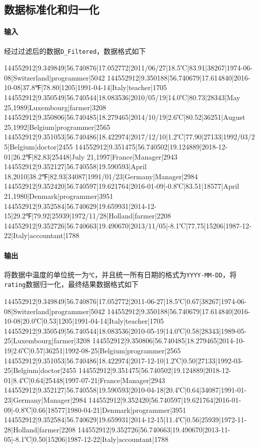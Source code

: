 \documentclass{ML}
\begin{document}
\subsection{数据标准化和归一化}
\paragraph{输入} 经过过滤后的数据\texttt{D\_Filtered}，数据格式如下
\begin{textcode}
144552912|9.349849|56.740876|17.052772|2011/06/27|18.5℃|83.91|38267|1974-06-08|Switzerland|programmer|5042
144552912|9.350188|56.740679|17.614840|2016-10-08|37.8℉|78.80|1205|1991-04-14|Italy|teacher|1705
144552912|9.350549|56.740544|18.083536|2010/05/19|14.0℃|80.73|28343|May 25,1989|Luxembourg|farmer|3208
144552912|9.350806|56.740485|18.279465|2014/10/19|2.6℃|80.52|36251|August 25,1992|Belgium|programmer|2565
144552912|9.351053|56.740486|18.422974|2017/12/10|1.2℃|77.90|27133|1992/03/25|Belgium|doctor|2455
144552912|9.351475|56.740502|19.124889|2018-12-01|26.2℉|82.83|25448|July 21,1997|France|Manager|2943
144552912|9.352127|56.740558|19.590593|April 18,2010|38.2℉|82.93|34087|1991/01/23|Germany|Manager|2984
144552912|9.352420|56.740597|19.621764|2016-01-09|-0.8℃|83.51|18577|April 21,1980|Denmark|programmer|3951
144552912|9.352584|56.740629|19.659931|2014-12-15|29.2℉|79.92|25939|1972/11/28|Holland|farmer|2208
144552912|9.352726|56.740663|19.490670|2013/11/05|-8.1℃|77.75|15206|1987-12-22|Italy|accountant|1788
\end{textcode}
\paragraph{输出} 将数据中温度的单位统一为\texttt{℃}，并且统一所有日期的格式为\texttt{YYYY-MM-DD}，将\texttt{rating}数据归一化，最终结果数据格式如下
\begin{textcode}
144552912|9.349849|56.740876|17.052772|2011-06-27|18.5℃|0.67|38267|1974-06-08|Switzerland|programmer|5042
144552912|9.350188|56.740679|17.614840|2016-10-08|20.0℃|0.53|1205|1991-04-14|Italy|teacher|1705
144552912|9.350549|56.740544|18.083536|2010-05-19|14.0℃|0.58|28343|1989-05-25|Luxembourg|farmer|3208
144552912|9.350806|56.740485|18.279465|2014-10-19|2.6℃|0.57|36251|1992-08-25|Belgium|programmer|2565
144552912|9.351053|56.740486|18.422974|2017-12-10|1.2℃|0.50|27133|1992-03-25|Belgium|doctor|2455
144552912|9.351475|56.740502|19.124889|2018-12-01|8.4℃|0.64|25448|1997-07-21|France|Manager|2943
144552912|9.352127|56.740558|19.590593|2010-04-18|20.4℃|0.64|34087|1991-01-23|Germany|Manager|2984
144552912|9.352420|56.740597|19.621764|2016-01-09|-0.8℃|0.66|18577|1980-04-21|Denmark|programmer|3951
144552912|9.352584|56.740629|19.659931|2014-12-15|11.4℃|0.56|25939|1972-11-28|Holland|farmer|2208
144552912|9.352726|56.740663|19.490670|2013-11-05|-8.1℃|0.50|15206|1987-12-22|Italy|accountant|1788
\end{textcode}
\end{document}
